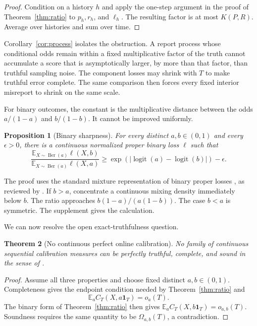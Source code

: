 \documentclass[twoside]{article}
\newtheorem{theorem}{Theorem}
\newtheorem{proposition}[theorem]{Proposition}
\newcommand{\E}{\mathbb E}
\newcommand{\1}{\mathbf 1}
\begin{document}
\begin{proof}
Condition on a history $h$ and apply the one-step argument in the proof of Theorem~\ref{thm:ratio} to $p_h,r_h$, and $\ell_h$. The resulting factor is at most $K(P,R)$. Average over histories and sum over time.
\end{proof}

Corollary~\ref{cor:process} isolates the obstruction. A report process whose conditional odds remain within a fixed multiplicative factor of the truth cannot accumulate a score that is asymptotically larger, by more than that factor, than truthful sampling noise. The component losses may shrink with $T$ to make truthful error complete. The same comparison then forces every fixed interior misreport to shrink on the same scale.

For binary outcomes, the constant is the multiplicative distance between the odds $a/(1-a)$ and $b/(1-b)$. It cannot be improved uniformly.

\begin{proposition}[Binary sharpness]
\label{prop:sharp}
For every distinct $a,b\in(0,1)$ and every $\epsilon>0$, there is a continuous normalized proper binary loss $\ell$ such that
\begin{equation}
 \frac{\E_{X\sim\operatorname{Ber}(a)}\ell(X,b)}
      {\E_{X\sim\operatorname{Ber}(a)}\ell(X,a)}
 \geq \exp(|\operatorname{logit}(a)-\operatorname{logit}(b)|)-\epsilon.
\end{equation}
\end{proposition}

The proof uses the standard mixture representation of binary proper losses \citep{gneiting2007strictly}, as reviewed by \citet{waghmare2025proper}. If $b>a$, concentrate a continuous mixing density immediately below $b$. The ratio approaches $b(1-a)/(a(1-b))$. The case $b<a$ is symmetric. The supplement gives the calculation.

We can now resolve the open exact-truthfulness question.

\begin{theorem}[No continuous perfect online calibration]
\label{thm:impossibility}
No family of continuous sequential calibration measures can be perfectly truthful, complete, and sound in the sense of \citet{haghtalab2024truthfulness}.
\end{theorem}

\begin{proof}
Assume all three properties and choose fixed distinct $a,b\in(0,1)$. Completeness gives the endpoint condition needed by Theorem~\ref{thm:ratio} and
\begin{equation*}
 \E_a C_T(X,a\1_T)=o_a(T).
\end{equation*}
The binary form of Theorem~\ref{thm:ratio} then gives $\E_a C_T(X,b\1_T)=o_{a,b}(T)$. Soundness requires the same quantity to be $\Omega_{a,b}(T)$, a contradiction.
\end{proof}
\end{document}
